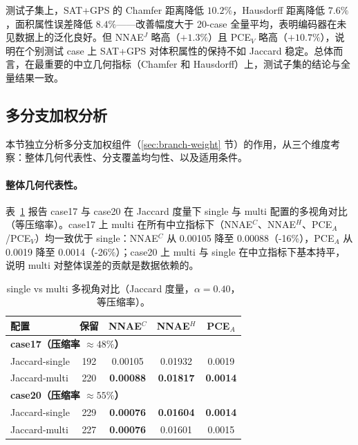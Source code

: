 \documentclass[twocolumn, a4paper, 10pt]{article}
\begin{document}
测试子集上，SAT+GPS 的 Chamfer 距离降低 $10.2\%$，Hausdorff 距离降低 $7.6\%$，面积属性误差降低 $8.4\%$——改善幅度大于 20-case 全量平均，表明编码器在未见数据上的泛化良好。但 NNAE$^J$ 略高（$+1.3\%$）且 PCE$_V$ 略高（$+10.7\%$），说明在个别测试 case 上 SAT+GPS 对体积属性的保持不如 Jaccard 稳定。总体而言，在最重要的中立几何指标（Chamfer 和 Hausdorff）上，测试子集的结论与全量结果一致。

\subsection{多分支加权分析}
\label{sec:exp-multibranch}

本节独立分析多分支加权组件（\ref{sec:branch-weight} 节）的作用，从三个维度考察：整体几何代表性、分支覆盖均匀性、以及适用条件。

\paragraph{整体几何代表性。}表~\ref{tab:multi-vs-single} 报告 case17 与 case20 在 Jaccard 度量下 single 与 multi 配置的多视角对比（等压缩率）。case17 上 multi 在所有中立指标下（NNAE$^C$、NNAE$^H$、PCE$_A$/PCE$_V$）均一致优于 single：NNAE$^C$ 从 0.00105 降至 0.00088（-16\%），PCE$_A$ 从 0.0019 降至 0.0014（-26\%）；case20 上 multi 与 single 在中立指标下基本持平，说明 multi 对整体误差的贡献是数据依赖的。

\begin{table}[h]
\centering
\scriptsize
\caption{single vs multi 多视角对比（Jaccard 度量，$\alpha=0.40$，等压缩率）。}
\label{tab:multi-vs-single}
\begin{tabular}{lcccc}
\hline
配置 & 保留 & NNAE$^C$ & NNAE$^H$ & PCE$_A$ \\
\hline
\multicolumn{5}{l}{\textbf{case17（压缩率 $\approx 48\%$）}} \\
Jaccard-single & 192 & 0.00105 & 0.01932 & 0.0019 \\
Jaccard-multi  & 220 & \textbf{0.00088} & \textbf{0.01817} & \textbf{0.0014} \\
\hline
\multicolumn{5}{l}{\textbf{case20（压缩率 $\approx 55\%$）}} \\
Jaccard-single & 229 & \textbf{0.00076} & \textbf{0.01604} & \textbf{0.0014} \\
Jaccard-multi  & 227 & \textbf{0.00076} & 0.01601 & 0.0015 \\
\hline
\end{tabular}
\end{table}
\end{document}
